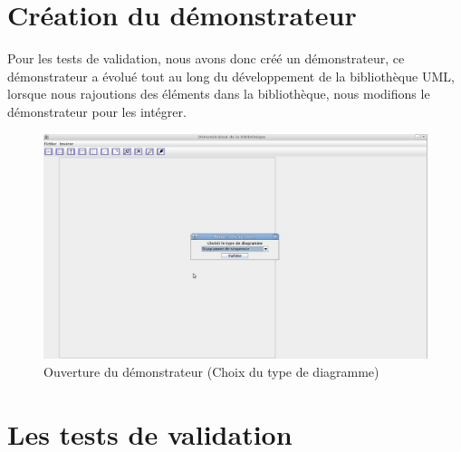 \documentclass[12pt,a4paper,openany]{report}
\begin{document}
	\section{Création du démonstrateur}
	Pour les tests de validation, nous avons donc créé un démonstrateur, ce démonstrateur a évolué tout au long du développement de la bibliothèque UML, 
	lorsque nous rajoutions des éléments dans la bibliothèque, nous modifions le démonstrateur pour les intégrer.
		\begin{figure}[H]
			\centering
			\includegraphics[width=18cm]{choixDiagramme.jpg}
			\caption{Ouverture du démonstrateur (Choix du type de diagramme)}
		\end{figure}
	\newpage
	\section{Les tests de validation}
\end{document}
